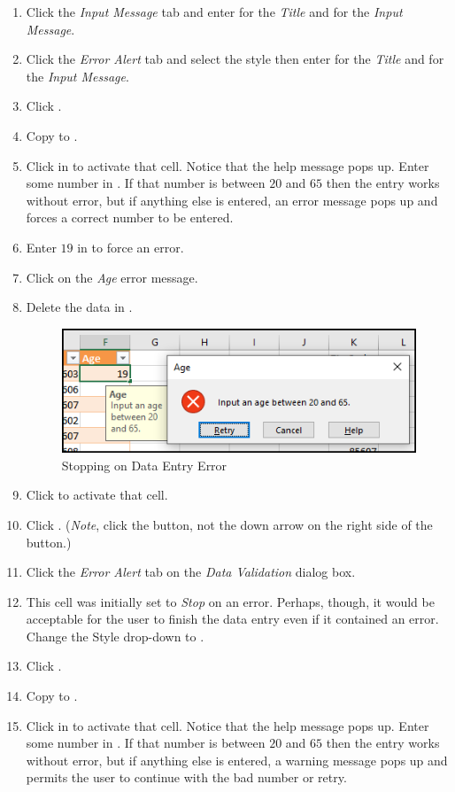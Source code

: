 \begin{enumbox}
\begin{enumerate}
		\item Click the \textit{Input Message} tab and enter  for the \textit{Title} and  for the \textit{Input Message}.
		\item Click the \textit{Error Alert} tab and select the  style then enter  for the \textit{Title} and  for the \textit{Input Message}.
		\item Click .
		\item Copy  to .
		\item Click in  to activate that cell. Notice that the help message pops up. Enter some number in . If that number is between $ 20 $ and $ 65 $ then the entry works without error, but if anything else is entered, an error message pops up and forces a correct number to be entered.
		\item Enter $ 19 $ in  to force an error.
		\item Click  on the \textit{Age} error message.
		\item Delete the data in .

		\begin{figure}[H]
			\centering
			\includegraphics[width=\maxwidth{.75\linewidth}]{gfx/ch07_fig40}
			\caption{Stopping on Data Entry Error}
			\label{07:fig40}
		\end{figure}

		\item Click  to activate that cell.
		\item Click . (\textit{Note}, click the button, not the down arrow on the right side of the button.)
		\item Click the \textit{Error Alert} tab on the \textit{Data Validation} dialog box. 
		\item This cell was initially set to \textit{Stop} on an error. Perhaps, though, it would be acceptable for the user to finish the data entry even if it contained an error. Change the Style drop-down to .
		\item Click .
		\item Copy  to .
		\item Click in  to activate that cell. Notice that the help message pops up. Enter some number in . If that number is between $ 20 $ and $ 65 $ then the entry works without error, but if anything else is entered, a warning message pops up and permits the user to continue with the bad number or retry.


\end{enumerate}
\end{enumbox}
